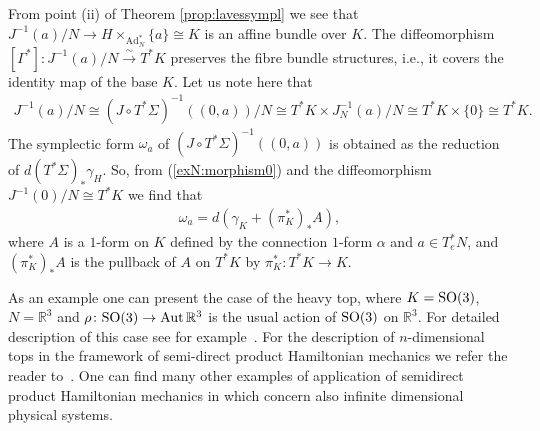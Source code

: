 \documentclass[pdftex]{sigma}
\renewcommand{\to}{\rightarrow}
\DeclareMathOperator{\Ad}{Ad}
\newcommand{\Aut}{\operatorname{Aut}}
\numberwithin{equation}{section}
\begin{document}
 From point (ii) of Theorem \ref{prop:lavessympl} we see that $J^{-1}(a)/N\to H\times _{\Ad^*_N}\{a\}\cong K$ is an af\/f\/ine bundle over $K$. The dif\/feomorphism $[\Gamma^*]\colon J^{-1}(a)/N\stackrel{\sim}{\to} T^*K$ preserves the f\/ibre bundle structures, i.e., it covers the identity map of the base $K$. Let us note here that
\begin{gather*} J^{-1}(a)/N\cong (J\circ T^*\Sigma)^{-1}((0,a))/N\cong T^*K\times J_N^{-1}(a)/N\cong T^*K\times \{0\}\cong T^*K . \end{gather*}
 The symplectic form $\omega_a$ of $(J\circ T^*\Sigma)^{-1}((0,a))$ is obtained as the reduction of $d(T^*\Sigma)_*\gamma_H$. So, from (\ref{exN:morphism0}) and the dif\/feomorphism $J^{-1}(0)/N\cong T^*K$ we f\/ind that
\begin{gather*}
 \omega_a=d(\gamma_K+(\pi_K^*)_*A),
\end{gather*}
where $A$ is a $1$-form on $K$ def\/ined by the connection $1$-form $\alpha$ and $a\in T^*_eN$, and $(\pi_K^*)_*A$ is the pullback of $A$ on $T^*K$ by $\pi^*_K\colon T^*K\to K$.

As an example one can present the case of the heavy top, where $K={\rm SO}(3)$, $N=\mathbb{R}^3$ and $\rho\colon {\rm SO}(3)\to \Aut\mathbb{R}^3$ is the usual action of ${\rm SO}(3)$ on $\mathbb{R}^3$. For detailed description of this case see for example~\cite{ratiu2}. For the description of $n$-dimensional tops in the framework of semi-direct product Hamiltonian mechanics we refer the reader to~\cite{ReymanSTS}. One can f\/ind many other examples of application of semidirect product Hamiltonian mechanics in \cite{ratiu1, holm, ratiu2} which concern also inf\/inite dimensional physical systems.
\end{document}

